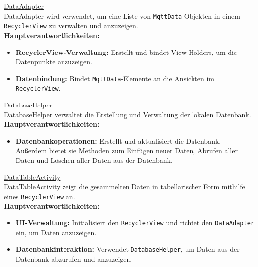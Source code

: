 \documentclass[conference,a4paper,flushend]{cs-techrep}
\begin{document}
\underline{DataAdapter}\vspace{0.5em}\\
DataAdapter wird verwendet, um eine Liste von \texttt{MqttData}-Objekten in einem \texttt{RecyclerView} zu verwalten und anzuzeigen.\\

\textbf{Hauptverantwortlichkeiten:}
\begin{itemize}
    \vspace{0.5em}
    \item \textbf{RecyclerView-Verwaltung:} Erstellt und bindet View-Holders, um die Datenpunkte anzuzeigen.
    \vspace{0.5em}
    \item \textbf{Datenbindung:} Bindet \texttt{MqttData}-Elemente an die Ansichten im \texttt{RecyclerView}.
    \vspace{0.5em}
\end{itemize}

\underline{DatabaseHelper}\vspace{0.5em}\\
DatabaseHelper verwaltet die Erstellung und Verwaltung der lokalen Datenbank.\\

\textbf{Hauptverantwortlichkeiten:}
\begin{itemize}
    \vspace{0.5em}
    \item \textbf{Datenbankoperationen:} Erstellt und aktualisiert die Datenbank. Außerdem bietet sie Methoden zum Einfügen neuer Daten, Abrufen aller Daten und Löschen aller Daten aus der Datenbank.
    \vspace{0.5em}
\end{itemize}

\underline{DataTableActivity}\vspace{0.5em}\\
DataTableActivity zeigt die gesammelten Daten in tabellarischer Form mithilfe eines \texttt{RecyclerView} an.\\

\textbf{Hauptverantwortlichkeiten:}
\begin{itemize}
    \vspace{0.5em}
    \item \textbf{UI-Verwaltung:} Initialisiert den \texttt{RecyclerView} und richtet den \texttt{DataAdapter} ein, um Daten anzuzeigen.
    \vspace{0.5em}
    \item \textbf{Datenbankinteraktion:} Verwendet \texttt{DatabaseHelper}, um Daten aus der Datenbank abzurufen und anzuzeigen.
    \vspace{0.5em}
\end{itemize}
\end{document}
